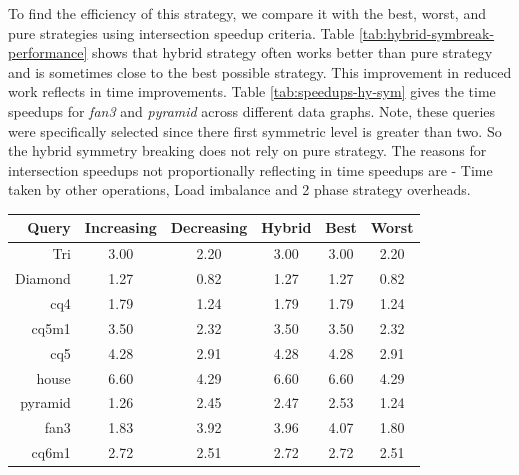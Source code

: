 {To find the efficiency of this strategy, we compare it with the best, worst, and pure strategies using intersection speedup criteria.
Table \ref{tab:hybrid-symbreak-performance} shows that hybrid strategy often works better than pure strategy and is sometimes close to the best possible strategy.
This improvement in reduced work reflects in time improvements.
Table \ref{tab:speedups-hy-sym} gives the time speedups for \textit{fan3} and \textit{pyramid} across different data graphs.
Note, these queries were specifically selected since there first symmetric level is greater than two.
So the hybrid symmetry breaking does not rely on pure strategy.
The reasons for intersection speedups not proportionally reflecting in time speedups are - Time taken by other operations, Load imbalance and 2 phase strategy overheads.

\begin{table}[]
    \centering
    \begin{tabular}{r|ccccc}
        \hline
        \textbf{Query} & \textbf{Increasing} & \textbf{Decreasing} & \textbf{Hybrid} & \textbf{Best} & \textbf{Worst} \\\hline
        Tri            & 3.00                & 2.20                & 3.00            & 3.00          & 2.20           \\
        Diamond        & 1.27                & 0.82                & 1.27            & 1.27          & 0.82           \\
        cq4            & 1.79                & 1.24                & 1.79            & 1.79          & 1.24           \\
        cq5m1          & 3.50                & 2.32                & 3.50            & 3.50          & 2.32           \\
        cq5            & 4.28                & 2.91                & 4.28            & 4.28          & 2.91           \\
        house          & 6.60                & 4.29                & 6.60            & 6.60          & 4.29           \\
        pyramid        & 1.26                & 2.45                & 2.47            & 2.53          & 1.24           \\
        fan3           & 1.83                & 3.92                & 3.96            & 4.07          & 1.80           \\
        cq6m1          & 2.72                & 2.51                & 2.72            & 2.72          & 2.51           \\

\end{tabular}
\end{table}}
